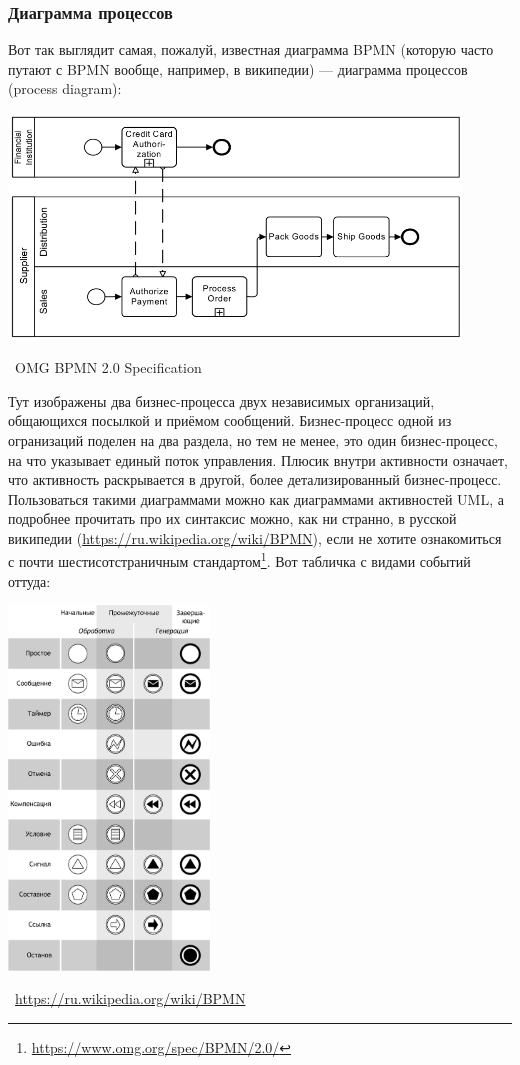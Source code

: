 \documentclass[a5paper]{article}
\newcommand{\attribution}[1] {
    \vspace{-4mm}\begin{flushright}\begin{scriptsize}%
    {\textcopyright\, #1}\end{scriptsize}\end{flushright}
}
\begin{document}
\subsubsection{Диаграмма процессов}

Вот так выглядит самая, пожалуй, известная диаграмма BPMN (которую часто путают с BPMN вообще, например, в википедии) --- диаграмма процессов (process diagram):

\begin{center}
    \includegraphics[width=0.9\textwidth]{bpmnExample.png}
    \attribution{OMG BPMN 2.0 Specification}
\end{center}

Тут изображены два бизнес-процесса двух независимых организаций, общающихся посылкой и приёмом сообщений. Бизнес-процесс одной из огранизаций поделен на два раздела, но тем не менее, это один бизнес-процесс, на что указывает единый поток управления. Плюсик внутри активности означает, что активность раскрывается в другой, более детализированный бизнес-процесс. Пользоваться такими диаграммами можно как диаграммами активностей UML, а подробнее прочитать про их синтаксис можно, как ни странно, в русской википедии (\url{https://ru.wikipedia.org/wiki/BPMN}), если не хотите ознакомиться с почти шестисотстраничным стандартом\footnote{\url{https://www.omg.org/spec/BPMN/2.0/}}. Вот табличка с видами событий оттуда:

\begin{center}
    \includegraphics[width=0.4\textwidth]{bpmnEvents.png}
    \attribution{\url{https://ru.wikipedia.org/wiki/BPMN}}
\end{center}
\end{document}
